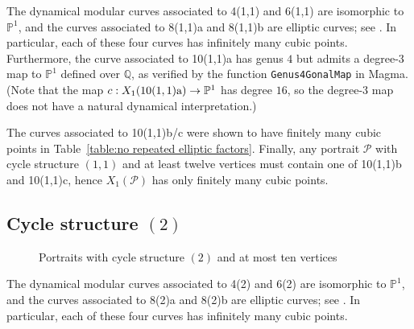 \documentclass[12pt]{amsart}
\theoremstyle{definition}
\newcommand{\bbP}{\mathbb{P}}
\newcommand{\bbQ}{\mathbb{Q}}
\newcommand{\calP}{\mathcal{P}}
\numberwithin{equation}{section}
\begin{document}
The dynamical modular curves associated to 4(1,1) and 6(1,1) are isomorphic to $\bbP^1$, and the curves associated to 8(1,1)a and 8(1,1)b are elliptic curves; see \cite{poonen:1998}. In particular, each of these four curves has infinitely many cubic points. Furthermore, the curve associated to 10(1,1)a has genus $4$ but admits a degree-$3$ map to $\bbP^1$ defined over $\bbQ$, as verified by the function {\tt Genus4GonalMap} in Magma. (Note that the map $c : X_1(\rm10(1,1)a)\to \bbP^1$ has degree $16$, so the degree-$3$ map does not have a natural dynamical interpretation.)

The curves associated to 10(1,1)b/c were shown to have finitely many cubic points in Table~\ref{table:no repeated elliptic factors}. Finally, any portrait $\calP$ with cycle structure $(1,1)$ and at least twelve vertices must contain one of 10(1,1)b and 10(1,1)c, hence $X_1(\calP)$ has only finitely many cubic points.

\subsection{Cycle structure $(2)$}

\begin{figure}
    \caption{Portraits with cycle structure $(2)$ and at most ten vertices}
    \label{fig:(2)}
\end{figure}

The dynamical modular curves associated to 4(2) and 6(2) are isomorphic to $\bbP^1$, and the curves associated to 8(2)a and 8(2)b are elliptic curves; see \cite{poonen:1998}. In particular, each of these four curves has infinitely many cubic points.
\end{document}
